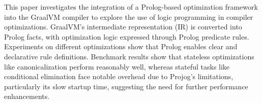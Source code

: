 This paper investigates the integration of a Prolog-based optimization framework into the GraalVM compiler to explore the use of logic programming in compiler optimizations. 
GraalVM’s intermediate representation (IR) is converted into Prolog facts, with optimization logic expressed through Prolog predicate rules. 
Experiments on different optimizations show that Prolog enables clear and declarative rule definitions. Benchmark results show that stateless optimizations like canonicalization perform reasonably well, whereas stateful tasks like conditional elimination face notable overhead due to Projog’s limitations, particularly its slow startup time, suggesting the need for further performance enhancements.